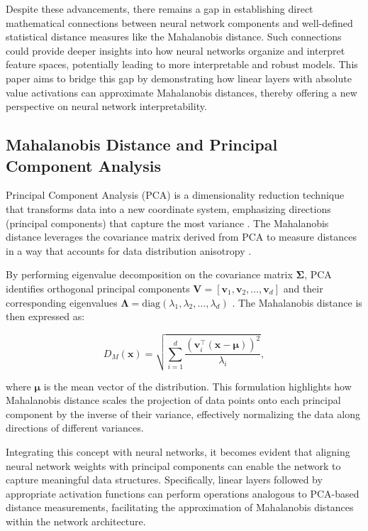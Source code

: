 Despite these advancements, there remains a gap in establishing direct mathematical connections between neural network components and well-defined statistical distance measures like the Mahalanobis distance. Such connections could provide deeper insights into how neural networks organize and interpret feature spaces, potentially leading to more interpretable and robust models. This paper aims to bridge this gap by demonstrating how linear layers with absolute value activations can approximate Mahalanobis distances, thereby offering a new perspective on neural network interpretability.

\subsection{Mahalanobis Distance and Principal Component Analysis}

Principal Component Analysis (PCA) is a dimensionality reduction technique that transforms data into a new coordinate system, emphasizing directions (principal components) that capture the most variance \citep{jolliffe2002principal}. The Mahalanobis distance leverages the covariance matrix derived from PCA to measure distances in a way that accounts for data distribution anisotropy \citep{hastie2009elements}.

By performing eigenvalue decomposition on the covariance matrix $\boldsymbol{\Sigma}$, PCA identifies orthogonal principal components $\mathbf{V} = [\mathbf{v}_1, \mathbf{v}_2, \dots, \mathbf{v}_d]$ and their corresponding eigenvalues $\boldsymbol{\Lambda} = \text{diag}(\lambda_1, \lambda_2, \dots, \lambda_d)$ \citep{jolliffe2002principal}. The Mahalanobis distance is then expressed as:

\begin{equation}
D_M(\mathbf{x}) = \sqrt{ \sum_{i=1}^d \frac{ (\mathbf{v}_i^\top (\mathbf{x} - \boldsymbol{\mu}))^2 }{ \lambda_i } },
\end{equation}

where $\boldsymbol{\mu}$ is the mean vector of the distribution. This formulation highlights how Mahalanobis distance scales the projection of data points onto each principal component by the inverse of their variance, effectively normalizing the data along directions of different variances.

Integrating this concept with neural networks, it becomes evident that aligning neural network weights with principal components can enable the network to capture meaningful data structures. Specifically, linear layers followed by appropriate activation functions can perform operations analogous to PCA-based distance measurements, facilitating the approximation of Mahalanobis distances within the network architecture.

